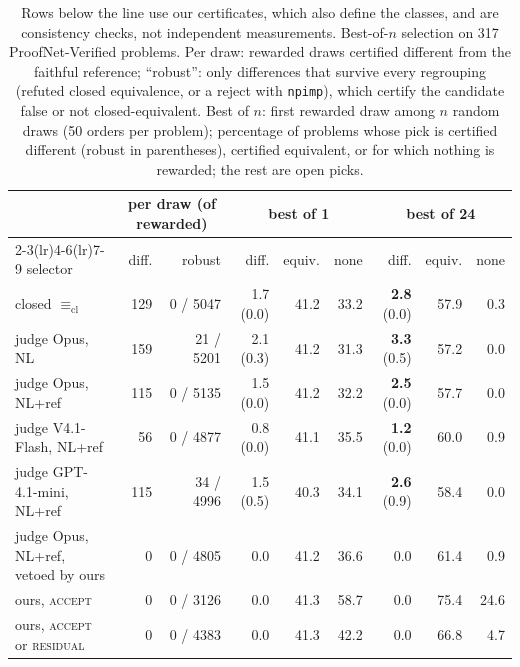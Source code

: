 \documentclass[10pt]{article}
\theoremstyle{definition}
\newcommand{\Ecl}{\mathrel{\equiv_{\mathrm{cl}}}}
\newcommand{\V}[1]{\textsc{#1}}
\begin{document}
\begin{table}[t]
\centering\small
\begin{tabular}{lrrrrrrrr}
\toprule
& \multicolumn{2}{c}{per draw (of rewarded)} & \multicolumn{3}{c}{best of 1} & \multicolumn{3}{c}{best of 24}\\
\cmidrule(lr){2-3}\cmidrule(lr){4-6}\cmidrule(lr){7-9}
selector & diff. & robust & diff. & equiv. & none & diff. & equiv. & none\\
\midrule
closed $\Ecl$ & 129 & 0 / 5047 & 1.7 (0.0) & 41.2 & 33.2 & \textbf{2.8} (0.0) & 57.9 & 0.3\\
judge Opus, NL & 159 & 21 / 5201 & 2.1 (0.3) & 41.2 & 31.3 & \textbf{3.3} (0.5) & 57.2 & 0.0\\
judge Opus, NL+ref & 115 & 0 / 5135 & 1.5 (0.0) & 41.2 & 32.2 & \textbf{2.5} (0.0) & 57.7 & 0.0\\
judge V4.1-Flash, NL+ref & 56 & 0 / 4877 & 0.8 (0.0) & 41.1 & 35.5 & \textbf{1.2} (0.0) & 60.0 & 0.9\\
judge GPT-4.1-mini, NL+ref & 115 & 34 / 4996 & 1.5 (0.5) & 40.3 & 34.1 & \textbf{2.6} (0.9) & 58.4 & 0.0\\
\midrule
judge Opus, NL+ref, vetoed by ours & 0 & 0 / 4805 & 0.0 & 41.2 & 36.6 & 0.0 & 61.4 & 0.9\\
ours, \V{accept} & 0 & 0 / 3126 & 0.0 & 41.3 & 58.7 & 0.0 & 75.4 & 24.6\\
ours, \V{accept} or \V{residual} & 0 & 0 / 4383 & 0.0 & 41.3 & 42.2 & 0.0 & 66.8 & 4.7\\
\bottomrule
\end{tabular}
\caption{Rows below the line use our certificates, which also define the classes, and are
consistency checks, not independent measurements. Best-of-$n$ selection on 317 ProofNet-Verified
problems. Per draw: rewarded draws certified different from the faithful reference; ``robust'':
only differences that survive every regrouping (refuted closed equivalence, or a reject with
\texttt{npimp}), which certify the candidate false or not closed-equivalent. Best of $n$:
first rewarded draw among $n$ random draws (50 orders per problem); percentage of problems whose
pick is certified different (robust in parentheses), certified equivalent, or for which nothing
is rewarded; the rest are open picks.}
\label{tab:select}
\end{table}
\end{document}
